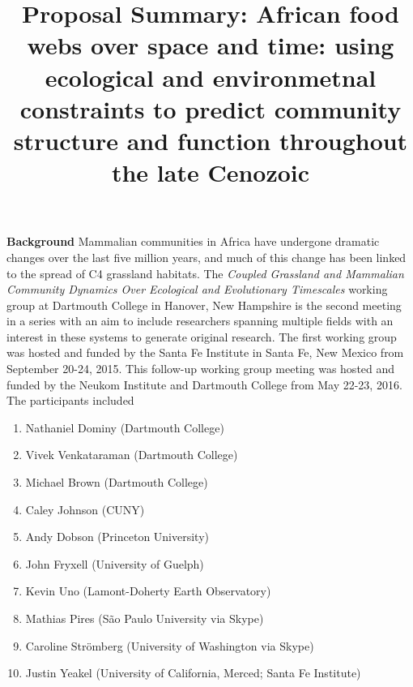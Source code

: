 \documentclass{article}[10pt]
\title{Proposal Summary: African food webs over space and time: using ecological and environmetnal constraints to predict community structure and function throughout the late Cenozoic}
\begin{document}
\maketitle

{\bf Background} Mammalian communities in Africa have undergone dramatic changes over the last five million years, and much of this change has been linked to the spread of C4 grassland habitats.
The \emph{Coupled Grassland and Mammalian Community Dynamics Over Ecological and Evolutionary Timescales} working group at Dartmouth College in Hanover, New Hampshire is the second meeting in a series with an aim to include researchers spanning multiple fields with an interest in these systems to generate original research.
The first working group was hosted and funded by the Santa Fe Institute in Santa Fe, New Mexico from September 20-24, 2015.
This follow-up working group meeting was hosted and funded by the Neukom Institute and Dartmouth College from May 22-23, 2016.
The participants included

\begin{enumerate}
\item Nathaniel Dominy (Dartmouth College)
\item Vivek Venkataraman (Dartmouth College)
\item Michael Brown (Dartmouth College)
\item Caley Johnson (CUNY)
\item Andy Dobson (Princeton University)
\item John Fryxell (University of Guelph)
\item Kevin Uno (Lamont-Doherty Earth Observatory)
\item Mathias Pires (S\~ao Paulo University via Skype)
\item Caroline Str\"omberg (University of Washington via Skype)
\item Justin Yeakel (University of California, Merced; Santa Fe Institute)
\end{enumerate}

\vspace{5 mm}
\end{document}
